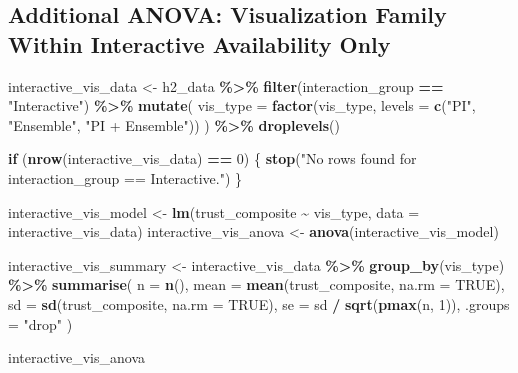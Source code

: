 \documentclass[
]{article}
\newenvironment{Shaded}{\begin{snugshade}}{\end{snugshade}}
\newcommand{\AttributeTok}[1]{\textcolor[rgb]{0.13,0.29,0.53}{#1}}
\newcommand{\ConstantTok}[1]{\textcolor[rgb]{0.56,0.35,0.01}{#1}}
\newcommand{\ControlFlowTok}[1]{\textcolor[rgb]{0.13,0.29,0.53}{\textbf{#1}}}
\newcommand{\DecValTok}[1]{\textcolor[rgb]{0.00,0.00,0.81}{#1}}
\newcommand{\FunctionTok}[1]{\textcolor[rgb]{0.13,0.29,0.53}{\textbf{#1}}}
\newcommand{\NormalTok}[1]{#1}
\newcommand{\OtherTok}[1]{\textcolor[rgb]{0.56,0.35,0.01}{#1}}
\newcommand{\SpecialCharTok}[1]{\textcolor[rgb]{0.81,0.36,0.00}{\textbf{#1}}}
\newcommand{\StringTok}[1]{\textcolor[rgb]{0.31,0.60,0.02}{#1}}
\begin{document}
\subsection{Additional ANOVA: Visualization Family Within Interactive
Availability
Only}\label{additional-anova-visualization-family-within-interactive-availability-only}

\begin{Shaded}
\begin{Highlighting}[]
\NormalTok{interactive\_vis\_data }\OtherTok{\textless{}{-}}\NormalTok{ h2\_data }\SpecialCharTok{\%\textgreater{}\%}
  \FunctionTok{filter}\NormalTok{(interaction\_group }\SpecialCharTok{==} \StringTok{"Interactive"}\NormalTok{) }\SpecialCharTok{\%\textgreater{}\%}
  \FunctionTok{mutate}\NormalTok{(}
    \AttributeTok{vis\_type =} \FunctionTok{factor}\NormalTok{(vis\_type, }\AttributeTok{levels =} \FunctionTok{c}\NormalTok{(}\StringTok{"PI"}\NormalTok{, }\StringTok{"Ensemble"}\NormalTok{, }\StringTok{"PI + Ensemble"}\NormalTok{))}
\NormalTok{  ) }\SpecialCharTok{\%\textgreater{}\%}
  \FunctionTok{droplevels}\NormalTok{()}

\ControlFlowTok{if}\NormalTok{ (}\FunctionTok{nrow}\NormalTok{(interactive\_vis\_data) }\SpecialCharTok{==} \DecValTok{0}\NormalTok{) \{}
  \FunctionTok{stop}\NormalTok{(}\StringTok{"No rows found for interaction\_group == \textquotesingle{}Interactive\textquotesingle{}."}\NormalTok{)}
\NormalTok{\}}

\NormalTok{interactive\_vis\_model }\OtherTok{\textless{}{-}} \FunctionTok{lm}\NormalTok{(trust\_composite }\SpecialCharTok{\textasciitilde{}}\NormalTok{ vis\_type, }\AttributeTok{data =}\NormalTok{ interactive\_vis\_data)}
\NormalTok{interactive\_vis\_anova }\OtherTok{\textless{}{-}} \FunctionTok{anova}\NormalTok{(interactive\_vis\_model)}

\NormalTok{interactive\_vis\_summary }\OtherTok{\textless{}{-}}\NormalTok{ interactive\_vis\_data }\SpecialCharTok{\%\textgreater{}\%}
  \FunctionTok{group\_by}\NormalTok{(vis\_type) }\SpecialCharTok{\%\textgreater{}\%}
  \FunctionTok{summarise}\NormalTok{(}
    \AttributeTok{n =} \FunctionTok{n}\NormalTok{(),}
    \AttributeTok{mean =} \FunctionTok{mean}\NormalTok{(trust\_composite, }\AttributeTok{na.rm =} \ConstantTok{TRUE}\NormalTok{),}
    \AttributeTok{sd =} \FunctionTok{sd}\NormalTok{(trust\_composite, }\AttributeTok{na.rm =} \ConstantTok{TRUE}\NormalTok{),}
    \AttributeTok{se =}\NormalTok{ sd }\SpecialCharTok{/} \FunctionTok{sqrt}\NormalTok{(}\FunctionTok{pmax}\NormalTok{(n, }\DecValTok{1}\NormalTok{)),}
    \AttributeTok{.groups =} \StringTok{"drop"}
\NormalTok{  )}

\NormalTok{interactive\_vis\_anova}
\end{Highlighting}
\end{Shaded}
\end{document}

